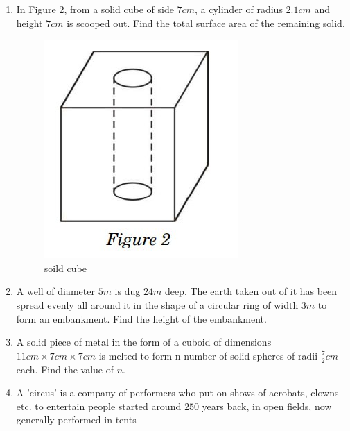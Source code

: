 \documentclass{article}
\begin{document}
\begin{enumerate}
\item  In Figure 2, from a solid cube of side $7 cm$, a cylinder of radius $2.1 cm$ and height $7 cm$ is scooped out. Find the total surface area of the remaining solid.
\begin{figure}[H]
\centering
\includegraphics[width=\columnwidth]{figs/solid cube.png}
\caption{soild cube}
\label{fig:solid cube}
\end{figure}

\item  A well of diameter $5 m$ is dug $24 m$ deep. The earth taken out of it has been spread evenly all around it in the shape of a circular ring of width $3 m$ to form an embankment. Find the height of the embankment.

 \item  A solid piece of metal in the form of a cuboid of dimensions $11 cm\times 7 cm\times 7 cm$ is melted to form n number of solid spheres of radii $\frac{7}{2}cm$ each. Find the value of $n$.
\newpage     
\item  A 'circus' is a company of performers who put on shows of acrobats, clowns etc. to entertain people started around $250$ years back, in open fields, now generally performed in tents


\end{enumerate}
\end{document}

